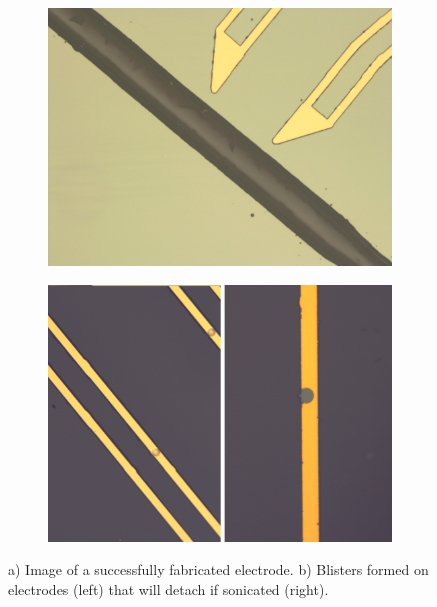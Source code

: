 \documentclass[final]{jyflluk}
\begin{document}
\begin{figure}[!h]
    \centering
    \begin{subfigure}{0.48\textwidth}
        \centering
        \includegraphics[width=\linewidth]{optical/good5.png} 
        \caption{} \label{fig:lahella}
    \end{subfigure}
    \hfill
    \begin{subfigure}{0.48\textwidth}
        \centering
        \includegraphics[width=\linewidth]{optical/blisters.png} 
        \caption{} \label{fig:blisteeriii}
    \end{subfigure}
    \caption{a) Image of a successfully fabricated electrode. b) Blisters formed on electrodes (left) that will detach if sonicated (right).} \label{fig:ghj}
\end{figure}  
\end{document}
